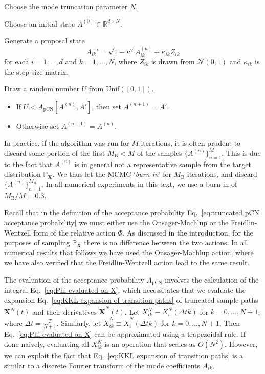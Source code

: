 \begin{enumerate}
\begin{samepage}
	\item Choose the mode truncation parameter $N$.
	\item Choose an initial state $A^{(0)} \in \mathbb{R}^{d \times N}$.
	\item Generate a proposal state
		\begin{equation} \label{eq:pCN proposal numerical algo}
			A_{ik}' = \sqrt{1 - \kappa^2} A_{ik}^{(n)} + \kappa_{ik} Z_{ik}
		\end{equation}
		for each $i=1,\dots,d$ and $k = 1,\dots,N$, where $Z_{ik}$ is drawn from $\mathcal{N}(0,1)$ and $\kappa_{ik}$ is the step-size matrix.
	\item Draw a random number $U$ from $\text{Unif}([0,1])$.
		\begin{itemize}
			\item If $U < A_\text{pCN}[A^{(n)}, A']$, then set $A^{(n+1)} = A'$.
			\item Otherwise set $A^{(n+1)} = A^{(n)}$.
		\end{itemize}
\end{samepage}
\end{enumerate}
In practice, if the algorithm was run for $M$ iterations, it is often prudent to discard some portion of the first $M_\text{B} < M$ of the samples $\{ A^{(n)} \}_{n=1}^{M}$. This is due to the fact that $A^{(0)}$ is in general not a representative sample from the target distribution $\mathbb{P}_\mathbf{X}$. We thus let the MCMC `\textit{burn in}' for $M_\text{B}$ iterations, and discard $\{ A^{(n)} \}_{n=1}^{M_\text{B}}$. In all numerical experiments in this text, we use a burn-in of $M_\text{B}/M = 0.3$.

Recall that in the definition of the acceptance probability Eq.~\ref{eq:truncated pCN acceptance probability} we must either use the Onsager-Machlup or the Freidlin-Wentzell form of the relative action $\Phi$. As discussed in the introduction, for the purposes of sampling $\mathbb{P}_\mathbf{X}$ there is no difference between the two actions. In all numerical results that follows we have used the Onsager-Machlup action, where we have also verified that the Freidlin-Wentzell action lead to the same result.

The evaluation of the acceptance probability $A_\text{pCN}$ involves the calculation of the integral Eq.~\ref{eq:Phi evaluated on X}, which necessitates that we evaluate the expansion Eq.~\ref{eq:KKL expansion of transition paths} of truncated sample paths $\mathbf{X}^N(t)$ and their derivatives $\dot{\mathbf{X}}^N(t)$. Let $X^N_{ik} \equiv X_i^N( \Delta t k )$ for $k = 0,\dots,N+1$, where $\Delta t = \frac{T}{N+1}$. Similarly, let $\dot{X}^N_{ik} \equiv \dot{X}_i^N( \Delta t k )$ for $k = 0,\dots,N+1$. Then Eq.~\ref{eq:Phi evaluated on X} can be approximated using a trapezoidal rule. If done naively, evaluating all $X^N_{ik}$ is an operation that scales as $O(N^2)$. However, we can exploit the fact that Eq.~\ref{eq:KKL expansion of transition paths} is a similar to a discrete Fourier transform of the mode coefficients $A_{ik}$.

